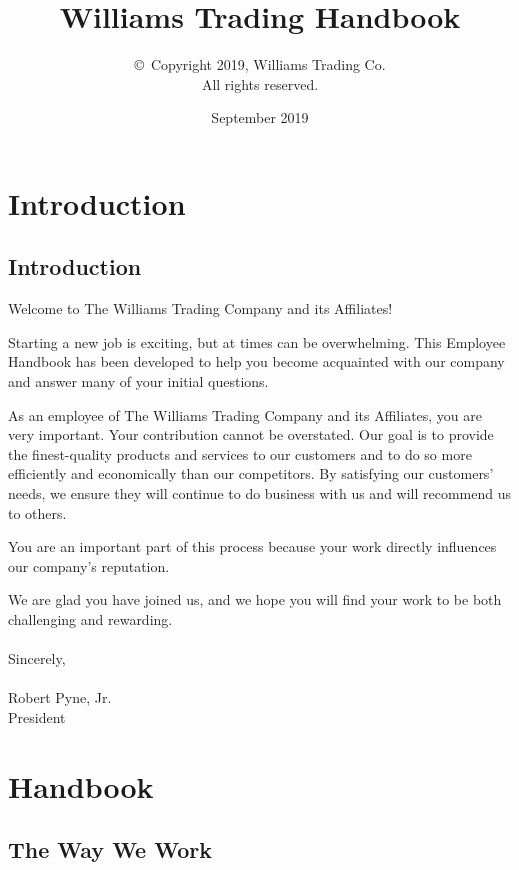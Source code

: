 \documentclass{book}
\title{Williams Trading Handbook}
\author{\copyright~Copyright 2019, Williams Trading Co.\\
 All rights reserved.}
\date{September 2019}
\begin{document}
\maketitle

\clearpage
{}
\tableofcontents

\setlength{\parindent}{0pt}
\setlength{\parskip}{1em}

\clearpage
{}

\chapter{Introduction}

\section{Introduction}

Welcome to The Williams Trading Company and its Affiliates!

Starting a new job is exciting, but at times can be overwhelming. This Employee Handbook has been developed to help you become acquainted with our company and answer many of your initial questions.

As an employee of The Williams Trading Company and its Affiliates, you are very important. Your contribution cannot be overstated. Our goal is to provide the finest-quality products and services to our customers and to do so more efficiently and economically than our competitors. By satisfying our customers' needs, we ensure they will continue to do business with us and will recommend us to others.

You are an important part of this process because your work directly influences our company's reputation.

We are glad you have joined us, and we hope you will find your work to be both challenging and rewarding.
\\
\\
Sincerely,
\\
\\
Robert Pyne, Jr.\\
President

\chapter{Handbook}

\section{The Way We Work}
\end{document}
